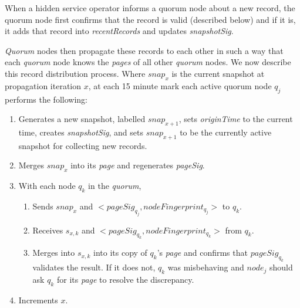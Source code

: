 When a hidden service operator informs a quorum node about a new record, the quorum node first confirms that the record is valid (described below) and if it is, it adds that record into \emph{recentRecords} and updates \emph{snapshotSig}. 


\emph{Quorum} nodes then propagate these records to each other in such a way that each \emph{quorum} node knows the \emph{pages} of all other \emph{quorum} nodes. We now describe this record distribution process. Where $ snap_{x} $ is the current snapshot at propagation iteration $ x $, at each 15 minute mark each active quorum node $ q_{j} $ performs the following:

\begin{enumerate}
	\item Generates a new snapshot, labelled $ snap_{x+1} $, sets \emph{originTime} to the current time, creates \emph{snapshotSig}, and sets $ snap_{x+1} $ to be the currently active snapshot for collecting new records.
	\item Merges $ snap_{x} $ into its \emph{page} and regenerates \emph{pageSig}.
	\item With each node $ q_{k} $ in the \emph{quorum}, 
		\begin{enumerate}
			\item Sends $ snap_{x} $ and $ <pageSig_{q_{j}}, nodeFingerprint_{q_{j}}> $ to $ q_{k} $.
			\item Receives $ s_{x, k} $ and $ <pageSig_{q_{k}}, nodeFingerprint_{q_{k}}> $ from $ q_{k} $.
			\item Merges into $ s_{x, k} $ into its copy of $ q_{k} $'s \emph{page} and confirms that $ pageSig_{q_{k}} $ validates the result. If it does not, $ q_{k} $ was misbehaving and $ node_{j} $ should ask $ q_{k} $ for its \emph{page} to resolve the discrepancy.
		\end{enumerate}
	\item Increments $ x $.
	
\end{enumerate}



